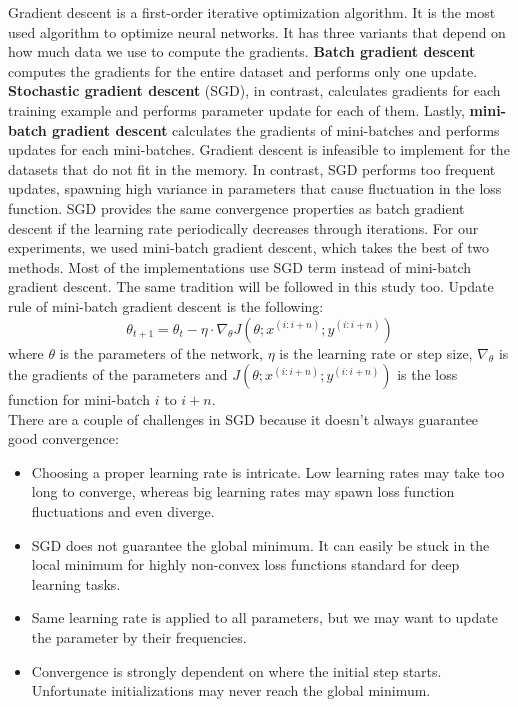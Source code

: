 \documentclass[a4paper, nobind]{templates/ociamthesis}
\begin{document}
Gradient descent is a first-order iterative optimization algorithm. It is the most used algorithm to optimize neural networks. It has three variants that depend on how much data we use to compute the gradients. \textbf{Batch gradient descent} computes the gradients for the entire dataset and performs only one update. \textbf{Stochastic gradient descent} (SGD), in contrast, calculates gradients for each training example and performs parameter update for each of them. Lastly, \textbf{mini-batch gradient descent} calculates the gradients of mini-batches and performs updates for each mini-batches.
Gradient descent is infeasible to implement for the datasets that do not fit in the memory. In contrast, SGD performs too frequent updates, spawning high variance in parameters that cause fluctuation in the loss function. SGD provides the same convergence properties as batch gradient descent if the learning rate periodically decreases through iterations. For our experiments, we used mini-batch gradient descent, which takes the best of two methods. Most of the implementations use SGD term instead of mini-batch gradient descent. The same tradition will be followed in this study too. Update rule of mini-batch gradient descent is the following:
\[
\theta_{t+1}=\theta_t-\eta \cdot \nabla_{\theta} J\left(\theta ; x^{(i: i+n)} ; y^{(i: i+n)}\right)
\]
where \(\theta\) is the parameters of the network, \(\eta\) is the learning rate or step size, \(\nabla_{\theta}\) is the gradients of the parameters and \(J\left(\theta ; x^{(i: i+n)} ; y^{(i: i+n)}\right)\) is the loss function for mini-batch \(i\) to \(i+n\).\\
There are a couple of challenges in SGD because it doesn't always guarantee good convergence:

\begin{itemize}
  \item Choosing a proper learning rate is intricate. Low learning rates may take too long to converge, whereas big learning rates may spawn loss function fluctuations and even diverge.
  \item SGD does not guarantee the global minimum. It can easily be stuck in the local minimum for highly non-convex loss functions standard for deep learning tasks.
  \item Same learning rate is applied to all parameters, but we may want to update the parameter by their frequencies.
  \item Convergence is strongly dependent on where the initial step starts. Unfortunate initializations may never reach the global minimum. 
\end{itemize}
\end{document}
